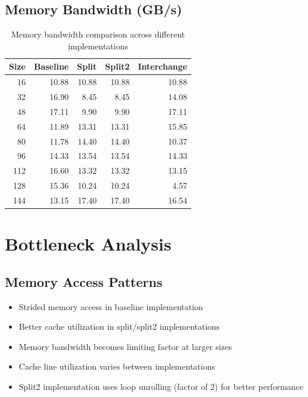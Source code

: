 \documentclass[11pt,a4paper]{article}
\begin{document}
\subsection{Memory Bandwidth (GB/s)}
\begin{table}[H]
\centering
\begin{tabular}{@{}rrrrr@{}}
\toprule
Size & Baseline & Split & Split2 & Interchange \\
\midrule
16   & 10.88    & 10.88 & 10.88  & 10.88 \\
32   & 16.90    & 8.45  & 8.45   & 14.08 \\
48   & 17.11    & 9.90  & 9.90   & 17.11 \\
64   & 11.89    & 13.31 & 13.31  & 15.85 \\
80   & 11.78    & 14.40 & 14.40  & 10.37 \\
96   & 14.33    & 13.54 & 13.54  & 14.33 \\
112  & 16.60    & 13.32 & 13.32  & 13.15 \\
128  & 15.36    & 10.24 & 10.24  & 4.57  \\
144  & 13.15    & 17.40 & 17.40  & 16.54 \\
\bottomrule
\end{tabular}
\caption{Memory bandwidth comparison across different implementations}
\label{tab:bandwidth}
\end{table}

\section{Bottleneck Analysis}
\subsection{Memory Access Patterns}
\begin{itemize}
    \item Strided memory access in baseline implementation
    \item Better cache utilization in split/split2 implementations
    \item Memory bandwidth becomes limiting factor at larger sizes
    \item Cache line utilization varies between implementations
    \item Split2 implementation uses loop unrolling (factor of 2) for better performance
\end{itemize}
\end{document}
